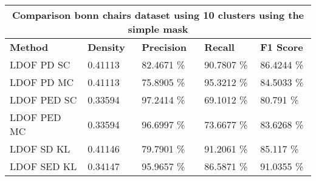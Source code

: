 \begin{table}[H]
\centering
\begin{tabular}{|l|l|l|l|l|}
\hline
\multicolumn{5}{|c|}{Comparison bonn chairs dataset using 10 clusters using the simple mask}                        \\ \hline
\textbf{Method} & \textbf{Density} & \textbf{Precision} & \textbf{Recall} & \textbf{F1 Score} \\ \hline
LDOF PD SC & 0.41113 & 82.4671 \%   & 90.7807 \%     & 86.4244 \% \\ \hline
LDOF PD MC & 0.41113 & 75.8905 \%   & 95.3212 \%     & 84.5033 \%  \\ \hline
LDOF PED SC & 0.33594 & 97.2414 \%   & 69.1012 \%     & 80.791 \%  \\ \hline
LDOF PED MC & 0.33594 & 96.6997 \%   & 73.6677 \%     & 83.6268 \%  \\ \hline              
LDOF SD KL & 0.41146 & 79.7901 \%   & 91.2061 \%     & 85.117 \%    \\ \hline
LDOF SED KL & 0.34147 & 95.9657 \%   & 86.5871 \%     & 91.0355 \%  \\ \hline
\end{tabular}
\caption[Bonn Chairs Merged 10 Clusters]{}
\label{tab:eval_bonn_chairs_c_10_simple}
\end{table}



